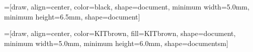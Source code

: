 =[draw, align=center, color=black, shape=document, 
  minimum width=5.0mm, minimum height=6.5mm, shape=document]

=[draw, align=center, color=KITbrown, fill=KITbrown,
  shape=document, minimum width=5.0mm, minimum height=6.0mm, shape=documentsm]





    
    




    
    


